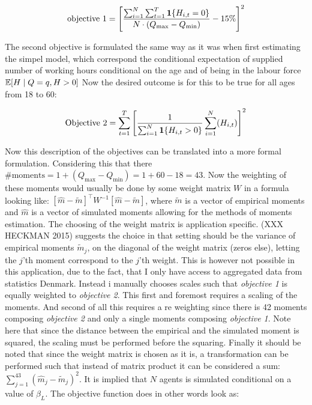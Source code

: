 \begin{equation}
    \text{objective 1} = \left[\frac{\sum_{i=1}^{N} \sum_{t=1}^T \mathbf{1}\{H_{i,t} = 0\}}{ N \cdot (Q_{\max} - Q_{\min} )} - 15\% \right]^2
\end{equation}

The second objective is formulated the same way as it was when first estimating the simpel model, which correspond the conditional expectation of supplied number of working hours conditional on the age and of being in the labour force $ \mathbb{E}[H \mid Q=q, H>0]$ Now the desired outcome is for this to be true for all ages from 18 to 60:


\begin{equation}
    \text{Objective 2} = \sum_{t=1}^{T} \left[ \frac{1}{\sum_{i=1}^{N} \mathbf{1}\{H_{i,t} > 0\}}\sum_{i=1}^N (H_{i,t})\right]^2
\end{equation}

Now this description of the objectives can be translated into a more formal formulation. Considering this that there $\text{\# moments}  = 1 + (Q_{\max} - Q_{\min}) = 1 + 60 - 18 = 43$. Now the weighting of these moments would usually be done by some weight matrix $W$ in a formula looking like: $[\hat{m} - \tilde{m}]^{\top} W^{-1} [\hat{m} - \tilde{m}]$, where $\tilde{m}$ is a vector of empirical moments and $\hat{m}$ is a vector of simulated moments allowing for the methods of moments estimation. The choosing of the weight matrix is application specific. (XXX HECKMAN 2015) suggests the choice in that setting should be the variance of empirical moments $\tilde{m}_j$, on the diagonal of the weight matrix (zeros else), letting the $j$'th moment correspond to the $j$'th weight. This is however not possible in this application, due to the fact, that I only have access to aggregated data from statistics Denmark. Instead i manually chooses scales such that \textit{objective 1} is equally weighted to \textit{objective 2}. This first and foremost requires a scaling of the moments. And second of all this requires a re weighting since there is 42 moments composing \textit{objective 2} and only a single moments composing \textit{objective 1}. Note here that since the distance between the empirical and the simulated moment is squared, the scaling must be performed before the squaring. Finally it should be noted that since the weight matrix is chosen as it is, a transformation can be performed such that instead of matrix product it can be considered a sum: $\sum_{j = 1}
^{43} ( \hat{m}_j - \tilde{m}_j )^2$. It is implied that $N$ agents is simulated conditional on a value of $\beta_L$. The objective function does in other words look as:

